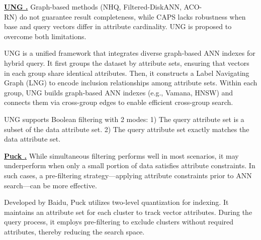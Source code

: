 \documentclass[sigconf, nonacm]{acmart}
\begin{document}
\noindent\textbf{\underline{UNG \cite{UNG}.}} Graph-based methods (NHQ, Filtered-DiskANN, ACO-\\RN) do not guarantee result completeness, while CAPS lacks robustness when base and query vectors differ in attribute cardinality. UNG is proposed to overcome both limitations.

UNG is a unified framework that integrates diverse graph-based ANN indexes for hybrid query. It first groups the dataset by attribute sets, ensuring that vectors in each group share identical attributes. Then, it constructs a Label Navigating Graph (LNG) to encode inclusion relationships among attribute sets. Within each group, UNG builds graph-based ANN indexes (e.g., Vamana, HNSW) and connects them via cross-group edges to enable efficient cross-group search.

UNG supports Boolean filtering with 2 modes:  
1) The query attribute set is a subset of the data attribute set.  
2) The query attribute set exactly matches the data attribute set.




\noindent\textbf{\underline{Puck \cite{puck}.}}  
While simultaneous filtering performs well in most scenarios, it may underperform when only a small portion of data satisfies attribute constraints. In such cases, a pre-filtering strategy—applying attribute constraints prior to ANN search—can be more effective.

Developed by Baidu, Puck utilizes two-level quantization for indexing. It maintains an attribute set for each cluster to track vector attributes. During the query process, it employs pre-filtering to exclude clusters without required attributes, thereby reducing the search space.
\end{document}
